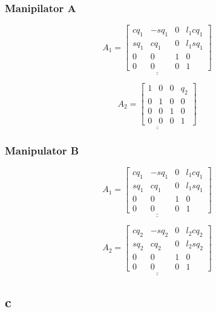 \documentclass{article}
\begin{document}
\subsubsection*{Manipilator A}

\begin{equation*}
\underline{\underline{A_1 = 
\begin{bmatrix}
c q_1 & - s q_1 & 0 & l_1 c q_1 \\
s q_1 & c q_1 & 0 & l_1 s q_1 \\
0 & 0 & 1 & 0 \\
0 & 0 & 0 & 1
\end{bmatrix}}}
\end{equation*}


\begin{equation*}
\underline{\underline{A_2 =
\begin{bmatrix}
1 & 0 & 0 & q_2 \\
0 & 1 & 0 & 0 \\
0 & 0 & 1 & 0 \\
0 & 0 & 0 & 1
\end{bmatrix}}}
\end{equation*}

\subsubsection*{Manipulator B}
\begin{equation*}
\underline{\underline{A_1 = 
\begin{bmatrix}
c q_1 & - s q_1 & 0 & l_1 c q_1 \\
s q_1 & c q_1 & 0 & l_1 s q_1 \\
0 & 0 & 1 & 0 \\
0 & 0 & 0 & 1
\end{bmatrix}}}
\end{equation*}

\begin{equation*}
\underline{\underline{A_2 = 
\begin{bmatrix}
c q_2 & - s q_2 & 0 & l_2 c q_2 \\
s q_2 & c q_2 & 0 & l_2 s q_2 \\
0 & 0 & 1 & 0 \\
0 & 0 & 0 & 1
\end{bmatrix}}}
\end{equation*}

\subsection{c}
\end{document}
